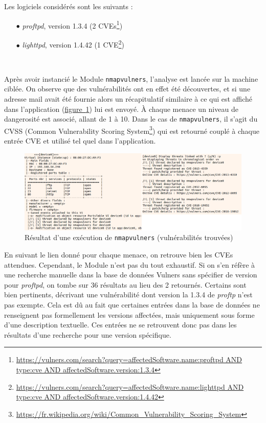 \documentclass[]{article}
\newcommand{\wordlink}[2]{\hyperref[#1]{#2~\ref{#1}}}
\begin{document}
Les logiciels considérés sont les suivants :

\begin{itemize}
\item[$\bullet$] \textit{proftpd}, version 1.3.4 (2 CVEs\footnote{\url{https://vulners.com/search?query=affectedSoftware.name:proftpd AND type:cve AND affectedSoftware.version:1.3.4}})
\item[$\bullet$] \textit{lighttpd}, version 1.4.42 (1 CVE\footnote{\url{https://vulners.com/search?query=affectedSoftware.name:lighttpd AND type:cve AND affectedSoftware.version:1.4.42}})
\end{itemize}
~\\

\par Après avoir instancié le Module \texttt{nmapvulners}, l'analyse est lancée sur la machine ciblée. On observe que des vulnérabilités ont en effet été découvertes, et si une adresse mail avait été fournie alors un récapitulatif similaire à ce qui est affiché dans l'application (\wordlink{threatsvm}{figure}) lui est envoyé. À chaque menace un niveau de dangerosité est associé, allant de 1 à 10. Dans le cas de \texttt{nmapvulners}, il s'agit du CVSS (Common Vulnerability Scoring System\footnote{\url{https://fr.wikipedia.org/wiki/Common_Vulnerability_Scoring_System}}) qui est retourné couplé à chaque entrée CVE et utilisé tel quel dans l'application.

\vspace{0.1cm}

\begin{figure}[!ht]
\centering
     \includegraphics[width=1.05\linewidth]{threatsVM}
     \caption{Résultat d'une exécution de \texttt{nmapvulners} (vulnérabilités trouvées)}
     \label{threatsvm}
\end{figure}

\newpage

En suivant le lien donné pour chaque menace, on retrouve bien les CVEs attendues. Cependant, le Module n'est pas du tout exhaustif. Si on s'en réfère à une recherche manuelle dans la base de données Vulners sans spécifier de version pour \textit{proftpd}, on tombe sur 36 résultats au lieu des 2 retournés. Certains sont bien pertinents, décrivant une vulnérabilité dont version la 1.3.4 de \textit{proftp} n'est pas exempte. Cela est dû au fait que certaines entrées dans la base de données ne renseignent pas formellement les versions affectées, mais uniquement sous forme d'une description textuelle. Ces entrées ne se retrouvent donc pas dans les résultats d'une recherche pour une version spécifique.\\
\end{document}
